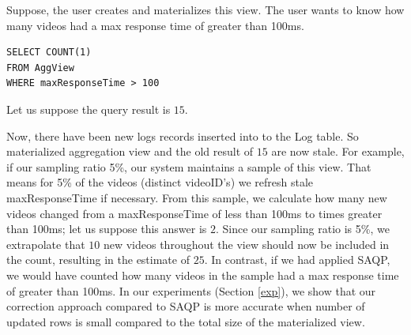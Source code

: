 Suppose, the user creates and materializes this view.
The user wants to know how many videos had a max response time of greater than 100ms.
\begin{lstlisting} 
SELECT COUNT(1)
FROM AggView
WHERE maxResponseTime > 100
\end{lstlisting}
Let us suppose the query result is $15$.

Now, there have been new logs records inserted into to the Log table. 
So materialized aggregation view and the old result of $15$ are now stale.
For example, if our sampling ratio 5\%, our system maintains a sample of this view.
That means for 5\% of the videos (distinct videoID's) we refresh stale maxResponseTime if necessary.
From this sample, we calculate how many new videos changed from a maxResponseTime of less than 100ms to times greater than 100ms; let us suppose this answer is $2$.
Since our sampling ratio is 5\%, we extrapolate that $10$ new videos throughout the view should now be included in the count, resulting in the estimate of $25$.
In contrast, if we had applied SAQP, we would have counted how many videos in the sample had a max response time of greater than 100ms.
In our experiments (Section \ref{exp}), we show that our correction approach compared to SAQP is more accurate when number of updated rows is small compared to the total size of the materialized view.